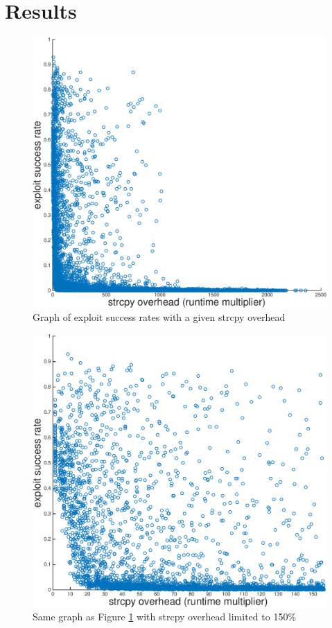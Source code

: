 \documentclass[letterpaper,twocolumn,10pt]{article}
\begin{document}
\section{Results}


\begin{figure}
\centering
\includegraphics[width=\columnwidth]{successrate.pdf}
\caption{Graph of exploit success rates with a given strcpy overhead}
\label{fig_successrate}
\end{figure}

\begin{figure}
\centering
\includegraphics[width=\columnwidth]{successratezoom.pdf}
\caption{Same graph as Figure \ref{fig_successrate} with strcpy overhead limited to 150\%}
\label{fig_successratezoom}
\end{figure}
\end{document}

